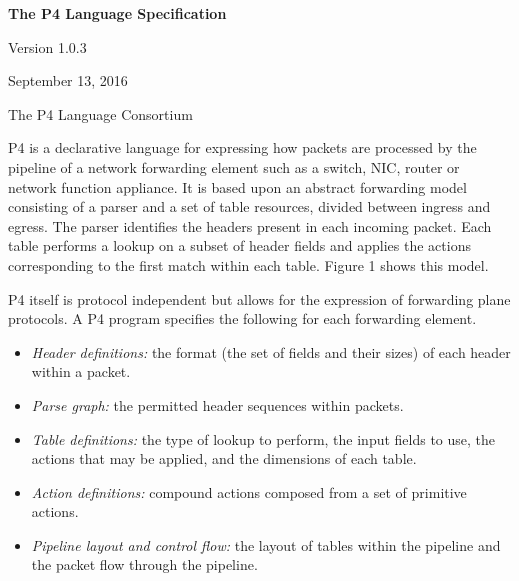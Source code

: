 \documentclass[12pt]{article}
\begin{document}
\vspace{2cm}

\centerline{\sffamily\bfseries\huge The P4 Language Specification}
\vspace{3mm}
\centerline{\sffamily\Large Version 1.0.3}
\vspace{3mm}
\centerline{\sffamily\large September 13, 2016}
\vspace{8mm}
\centerline{\sffamily\large The P4 Language Consortium}

\date{September 13, 2016}
\thispagestyle{firstpagestyle}


P4 is a declarative language for expressing how packets are processed by the 
pipeline of a network forwarding element such as a switch, NIC, router or 
network function appliance. It is based upon an abstract forwarding model 
consisting of a parser and a set of \matchaction table resources, divided 
between ingress and egress. The parser identifies the headers present in 
each incoming packet. Each \matchaction table performs a lookup on a subset 
of header fields and applies the actions corresponding to the first match 
within each table. Figure 1 shows this model.

P4 itself is protocol independent but allows for the expression of forwarding 
plane protocols. A P4 program specifies the following for each forwarding 
element.

\begin{itemize}
\item
\textit{Header definitions:} the format (the set of fields and their
sizes) of each header within a packet.
\item
\textit{Parse graph:} the permitted header sequences within packets.
\item
\textit{Table definitions:} the type of lookup to perform, the input
fields to use, the actions that may be applied, and the dimensions of
each table.
\item
\textit{Action definitions:} compound actions composed from a set of
primitive actions.
\item
\textit{Pipeline layout and control flow:} the layout of tables within
the pipeline and the packet flow through the pipeline.
\end{itemize}
\end{document}

